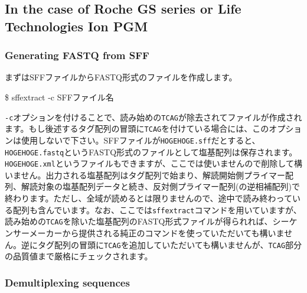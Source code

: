 \documentclass[titlepage,10pt,a4paper,english]{jsbook}
\newenvironment{cmd}{\begin{oframed}\raggedright\ttfamily\footnotesize\setlength{\baselineskip}{1.4em}}{\end{oframed}\vspace{-1em}}
\begin{document}
\subsection{In the case of Roche GS series or Life Technologies Ion PGM}

\subsubsection{Generating FASTQ from SFF}

まずはSFFファイルからFASTQ形式のファイルを作成します。
\begin{cmd}
\$ sff{\textunderscore}extract -c SFFファイル名
\end{cmd}
\texttt{-c}オプションを付けることで、読み始めの\texttt{TCAG}が除去されてファイルが作成されます。もし後述するタグ配列の冒頭に\texttt{TCAG}を付けている場合には、このオプションは使用しないで下さい。SFFファイルが\texttt{HOGEHOGE.sff}だとすると、\texttt{HOGEHOGE.fastq}というFASTQ形式のファイルとして塩基配列は保存されます。\texttt{HOGEHOGE.xml}というファイルもできますが、ここでは使いませんので削除して構いません。出力される塩基配列はタグ配列で始まり、解読開始側プライマー配列、解読対象の塩基配列データと続き、反対側プライマー配列(の逆相補配列)で終わります。ただし、全域が読めるとは限りませんので、途中で読み終わっている配列も含んでいます。なお、ここでは\texttt{sff{\textunderscore}extract}コマンドを用いていますが、読み始めの\texttt{TCAG}を除いた塩基配列のFASTQ形式ファイルが得られれば、シーケンサーメーカーから提供される純正のコマンドを使っていただいても構いません。逆にタグ配列の冒頭に\texttt{TCAG}を追加していただいても構いませんが、\texttt{TCAG}部分の品質値まで厳格にチェックされます。

\subsubsection{Demultiplexing sequences}
\end{document}
